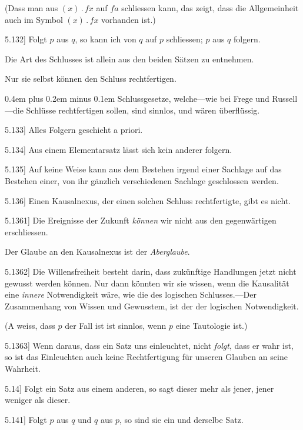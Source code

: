 \documentclass[12pt,oneside]{book}[2007/10/19]
\newcommand{\PropERef}[1]{\hyperref[PropE:#1]{#1}}
\newcommand{\PropositionG}[2]{%
  \item[\phantomsection\label{PropG:#1}\PropERef{#1}] #2%
}
\newcommand{\DotOp}{\mathbin{.}}
\newcommand{\Emph}[1]{\emph{#1}}%
\newcommand{\stretchyspace}{\spaceskip0.4em plus 0.2em minus 0.1em}
\begin{document}
\begin{propositions}
{(Dass man aus $(x) \DotOp fx$ auf $fa$ schliessen kann,
das zeigt, dass die Allgemeinheit auch im Symbol
\glqq{}$(x) \DotOp fx$\grqq{} vorhanden ist.)}


\PropositionG{5.132}
{Folgt $p$ aus $q$, so kann ich von $q$ auf $p$ schliessen;
$p$ aus $q$ folgern.

Die Art des Schlusses ist allein aus den beiden
Sätzen zu entnehmen.

Nur sie selbst können den Schluss rechtfertigen.

{\stretchyspace
\glqq{}Schlussgesetze\grqq{}, welche---wie bei Frege und
Russell---die Schlüsse rechtfertigen sollen, sind
sinnlos, und wären überflüssig.}}


\PropositionG{5.133}
{Alles Folgern geschieht a priori.}


\PropositionG{5.134}
{Aus einem Elementarsatz lässt sich kein anderer
folgern.}


\PropositionG{5.135}
{Auf keine Weise kann aus dem Bestehen irgend
einer Sachlage auf das Bestehen einer, von ihr gänzlich
verschiedenen Sachlage geschlossen werden.}


\PropositionG{5.136}
{Einen Kausalnexus, der einen solchen Schluss
rechtfertigte, gibt es nicht.}


\PropositionG{5.1361}
{Die Ereignisse der Zukunft \Emph{können} wir nicht
aus den gegenwärtigen erschliessen.

Der Glaube an den Kausalnexus ist der \Emph{Aberglaube}.}


\PropositionG{5.1362}
{Die Willensfreiheit besteht darin, dass zukünftige
Handlungen jetzt nicht gewusst werden können.
Nur dann könnten wir sie wissen, wenn die Kausalität
eine \Emph{innere} Notwendigkeit wäre, wie die
des logischen Schlusses.---Der Zusammenhang
von Wissen und Gewusstem, ist der der logischen
Notwendigkeit.

(\glqq{}A weiss, dass $p$ der Fall ist\grqq{} ist sinnlos, wenn
$p$ eine Tautologie ist.)}


\PropositionG{5.1363}
{Wenn daraus, dass ein Satz uns einleuchtet,
nicht \Emph{folgt}, dass er wahr ist, so ist das Einleuchten
auch keine Rechtfertigung für unseren
Glauben an seine Wahrheit.}


\PropositionG{5.14}
{Folgt ein Satz aus einem anderen, so sagt
dieser mehr als jener, jener weniger als dieser.}


\PropositionG{5.141}
{Folgt $p$ aus $q$ und $q$ aus $p$, so sind sie ein und
derselbe Satz.}



\end{propositions}
\end{document}
